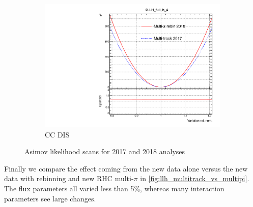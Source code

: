 \begin{figure}[h]
\begin{subfigure}[t]{0.32\textwidth}
		\includegraphics[width=\textwidth,page=26, trim={0mm 0mm 0mm 9mm}, clip]{figures/mach3/2018/llh/MultiPi_vs_MultiTrack_TotalLLH_2017vs2018}
		\caption{CC DIS}
	\end{subfigure}
	\caption{Asimov likelihood scans for 2017 and 2018 analyses}
	\label{fig:llh_2017_vs_2018}
\end{figure}

Finally we compare the effect coming from the new data alone versus the new data with rebinning and new RHC multi-$\pi$ in \autoref{fig:llh_multitrack_vs_multipi}. The flux parameters all varied less than 5\%, whereas many interaction parameters see large changes. 


